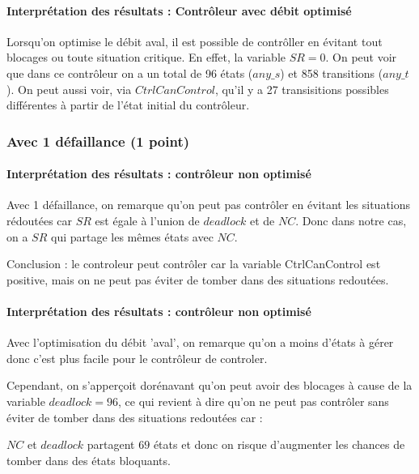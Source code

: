 \documentclass[a4paper]{book}
\begin{document}
\paragraph{Interprétation des résultats : Contrôleur avec débit optimisé}

Lorsqu'on optimise le débit aval, il est possible de contrôller en évitant tout blocages ou toute situation critique. En effet, la variable $SR = 0$.
On peut voir que dans ce contrôleur on a un total de 96 états ($any\_s$) et 858 transitions ($any\_t$). On peut aussi voir, via $CtrlCanControl$, qu'il y a 27 transisitions possibles différentes à partir de l'état initial du contrôleur.

\subsubsection{Avec 1 défaillance (1 point)}


%
%
%
\paragraph{Interprétation des résultats : contrôleur non optimisé}
Avec 1 défaillance, on remarque qu'on peut pas contrôler en évitant les situations rédoutées car $SR$ est égale à l'union de $deadlock$ et de $NC$.
Donc dans notre cas, on a $SR$ qui partage les mêmes états avec $NC$.

Conclusion : le controleur peut contrôler car la variable CtrlCanControl est positive, mais on ne peut pas éviter de tomber dans des situations redoutées.

\paragraph{Interprétation des résultats : contrôleur non optimisé}
Avec l'optimisation du débit 'aval', on remarque qu'on a moins d'états à gérer donc c'est plus facile pour le contrôleur de controler.

Cependant, on s'apperçoit dorénavant qu'on peut avoir des blocages à cause de la variable $deadlock = 96$, ce qui revient à dire qu'on ne peut pas contrôler sans éviter de tomber dans des situations redoutées car :

$NC$ et $deadlock$ partagent $69$ états et donc on risque d'augmenter les chances de tomber dans des états bloquants.
\end{document}
